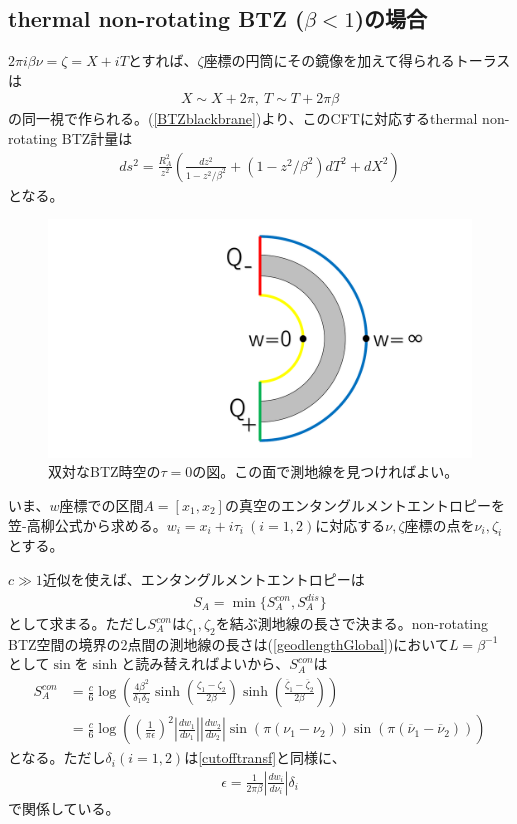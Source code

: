\subsection{thermal non-rotating BTZ ($\beta<1$)の場合}
$2\pi i \beta \nu=\zeta=X+i T$とすれば、$\zeta$座標の円筒にその鏡像を加えて得られるトーラスは
\begin{align}
X\sim X+2\pi,\ T\sim T+2\pi\beta
\end{align}
の同一視で作られる。(\ref{BTZblackbrane})より、このCFTに対応するthermal non-rotating BTZ計量は
\begin{align}
ds^2=\frac{R_A^2}{z^2}\left( \frac{dz^2}{1-z^2/\beta^2}+\left(1-z^2/\beta^2\right)dT^2+dX^2 \right)
\end{align}
となる。
\begin{figure}[h]
	\centering
	\includegraphics[width=0.7\linewidth]{DQads.pdf}
	\caption{双対なBTZ時空の$\tau=0$の図。この面で測地線を見つければよい。}
	\label{fig:dqads}
\end{figure}

いま、$w$座標での区間$A=[x_1,x_2]$の真空のエンタングルメントエントロピーを笠-高柳公式から求める。$w_i=x_i+i\tau_i\ (i=1,2)$に対応する$\nu,\zeta$座標の点を$\nu_i,\zeta_i$とする。

$c\gg 1$近似を使えば、エンタングルメントエントロピーは
\begin{align}
S_A=\min\{ S_A^{con},S_A^{dis} \}
\end{align}
として求まる。ただし$S_A^{con}$は$\zeta_1,\zeta_2$を結ぶ測地線の長さで決まる。non-rotating BTZ空間の境界の$2$点間の測地線の長さは(\ref{geodlengthGlobal})において$L=\beta^{-1}$として$\sin$を$\sinh$と読み替えればよいから、$S_A^{con}$は
\begin{align}
S^{con}_A&=\frac{c}{6}\log \left( \frac{4\beta^2}{\delta_1\delta_2}\sinh\left(\frac{\zeta_1-\zeta_2}{2\beta} \right)\sinh\left(\frac{\overline{\zeta}_1-\overline{\zeta}_2}{2\beta} \right) \right)\\
&=\frac{c}{6}\log \left( \left(\frac{1}{\pi\epsilon}\right)^2\left|\frac{dw_1}{d\nu_1}\right|\left|\frac{dw_2}{d\nu_2}\right|\sin\left(\pi (\nu_1-\nu_2) \right)\sin\left(\pi (\overline{\nu}_1-\overline{\nu}_2) \right) \right)
\end{align}
となる。ただし$\delta_i (i=1,2)$は\ref{cutofftransf}と同様に、
\begin{align}
\epsilon = \frac{1}{2\pi\beta}\left|\frac{dw_i}{d\nu_i}\right| \delta_i
\end{align}
で関係している。

